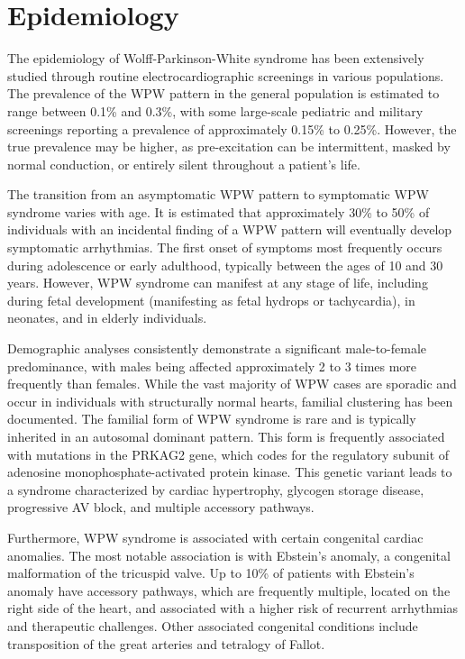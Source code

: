 \section*{Epidemiology}
The epidemiology of Wolff-Parkinson-White syndrome has been extensively studied through routine electrocardiographic screenings in various populations. The prevalence of the WPW pattern in the general population is estimated to range between 0.1\% and 0.3\%, with some large-scale pediatric and military screenings reporting a prevalence of approximately 0.15\% to 0.25\%. However, the true prevalence may be higher, as pre-excitation can be intermittent, masked by normal conduction, or entirely silent throughout a patient's life.

The transition from an asymptomatic WPW pattern to symptomatic WPW syndrome varies with age. It is estimated that approximately 30\% to 50\% of individuals with an incidental finding of a WPW pattern will eventually develop symptomatic arrhythmias. The first onset of symptoms most frequently occurs during adolescence or early adulthood, typically between the ages of 10 and 30 years. However, WPW syndrome can manifest at any stage of life, including during fetal development (manifesting as fetal hydrops or tachycardia), in neonates, and in elderly individuals.

Demographic analyses consistently demonstrate a significant male-to-female predominance, with males being affected approximately 2 to 3 times more frequently than females. While the vast majority of WPW cases are sporadic and occur in individuals with structurally normal hearts, familial clustering has been documented. The familial form of WPW syndrome is rare and is typically inherited in an autosomal dominant pattern. This form is frequently associated with mutations in the PRKAG2 gene, which codes for the regulatory subunit of adenosine monophosphate-activated protein kinase. This genetic variant leads to a syndrome characterized by cardiac hypertrophy, glycogen storage disease, progressive AV block, and multiple accessory pathways.

Furthermore, WPW syndrome is associated with certain congenital cardiac anomalies. The most notable association is with Ebstein's anomaly, a congenital malformation of the tricuspid valve. Up to 10\% of patients with Ebstein's anomaly have accessory pathways, which are frequently multiple, located on the right side of the heart, and associated with a higher risk of recurrent arrhythmias and therapeutic challenges. Other associated congenital conditions include transposition of the great arteries and tetralogy of Fallot.

